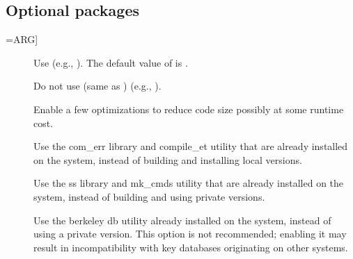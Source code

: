 \documentclass[letterpaper,10pt,english]{sphinxmanual}
\begin{document}
\subsection{Optional packages}
\label{\detokenize{build/options2configure:optional-packages}}\begin{description}
\item[{\sphinxstylestrong{\sphinxhyphen{}}\sphinxstyleemphasis{PACKAGE}{[}=ARG{]}}] \leavevmode
\sphinxAtStartPar
Use  (e.g., ).  The default value of 
is .

\item[{\sphinxstylestrong{\sphinxhyphen{}}}] \leavevmode
\sphinxAtStartPar
Do not use  (same as )
(e.g., ).

\item[{\sphinxstylestrong{\sphinxhyphen{}}}] \leavevmode
\sphinxAtStartPar
Enable a few optimizations to reduce code size possibly at some
run\sphinxhyphen{}time cost.

\item[{\sphinxstylestrong{\sphinxhyphen{}}}] \leavevmode
\sphinxAtStartPar
Use the com\_err library and compile\_et utility that are already
installed on the system, instead of building and installing
local versions.

\item[{\sphinxstylestrong{\sphinxhyphen{}}}] \leavevmode
\sphinxAtStartPar
Use the ss library and mk\_cmds utility that are already installed
on the system, instead of building and using private versions.

\item[{\sphinxstylestrong{\sphinxhyphen{}}}] \leavevmode
\sphinxAtStartPar
Use the berkeley db utility already installed on the system,
instead of using a private version.  This option is not
recommended; enabling it may result in incompatibility with key
databases originating on other systems.


\end{description}
\end{document}
